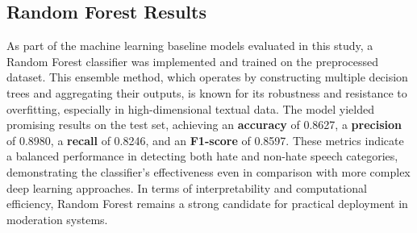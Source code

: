 \subsection{Random Forest Results}
\label{sec:random_forest_results}

As part of the machine learning baseline models evaluated in this study, a Random Forest classifier was implemented and trained on the preprocessed dataset. This ensemble method, which operates by constructing multiple decision trees and aggregating their outputs, is known for its robustness and resistance to overfitting, especially in high-dimensional textual data. The model yielded promising results on the test set, achieving an \textbf{accuracy} of 0.8627, a \textbf{precision} of 0.8980, a \textbf{recall} of 0.8246, and an \textbf{F1-score} of 0.8597. These metrics indicate a balanced performance in detecting both hate and non-hate speech categories, demonstrating the classifier's effectiveness even in comparison with more complex deep learning approaches. In terms of interpretability and computational efficiency, Random Forest remains a strong candidate for practical deployment in moderation systems.
